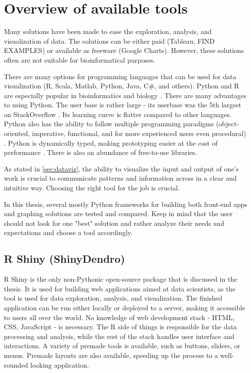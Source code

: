 \chapter{Overview of available tools}
\label{chap:four}
Many solutions have been made to ease the exploration, analysis, and visualization of data. The solutions can be either paid (Tableau, FIND EXAMPLES) or available as freeware (Google Charts). However, these solutions often are not suitable for bioinformatical purposes. 

There are many options for programming languages that can be used for data visualization (R, Scala, Matlab, Python, Java, C\#, and others). Python and R are especially popular in bioinformatics and biology \citep{giorgi2022r, gentleman2008r, bassi2016python}. There are many advantages to using Python. The user base is rather large - its userbase was the 5th largest on StackOverflow \citep{srinath2017python}. Its learning curve is flatter compared to other languages. Python also has the ability to follow multiple programming paradigms (object-oriented, imperative, functional, and for more experienced users even procedural) \citep{srinath2017python, dyer2022exploratory}. Python is dynamically typed, making prototyping easier at the cost of performance \citep{tratt2009dynamically}. There is also an abundance of free-to-use libraries.

As stated in \ref{sec:dataviz}, the ability to visualize the input and output of one's work is crucial to communicate patterns and information across in a clear and intuitive way. Choosing the right tool for the job is crucial. 

In this thesis, several mostly Python frameworks for building both front-end apps and graphing solutions are tested and compared. Keep in mind that the user should not look for one "best" solution and rather analyze their needs and expectations and choose a tool accordingly. 

\section{R Shiny (ShinyDendro)}
\label{sec:streamlit}
R Shiny is the only non-Pythonic open-source package that is discussed in the thesis. It is used for building web applications aimed at data scientists, as the tool is used for data exploration, analysis, and visualization. The finished application can be run either locally or deployed to a server, making it accessible to users all over the world. No knowledge of web development stack - HTML, CSS, JavaScript - is necessary. The R side of things is responsible for the data processing and analysis, while the rest of the stack handles user interface and interactions. A variety of premade tools is available, such as buttons, sliders, or menus. Premade layouts are also available, speeding up the process to a well-rounded looking application.

